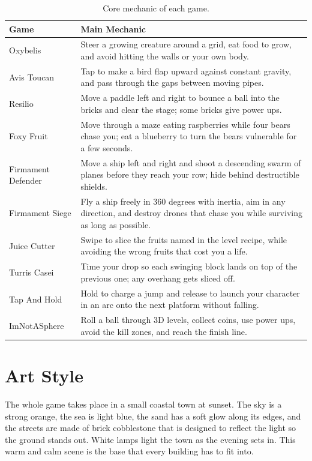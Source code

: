 \documentclass[12pt,letterpaper]{article}
\begin{document}
\begin{table}[H]
\centering
\footnotesize
\begin{tabular}{|p{3.2cm}|p{12cm}|}
\hline
\textbf{Game} & \textbf{Main Mechanic} \\
\hline
Oxybelis & Steer a growing creature around a grid, eat food to grow, and avoid hitting the walls or your own body. \\
\hline
Avis Toucan & Tap to make a bird flap upward against constant gravity, and pass through the gaps between moving pipes. \\
\hline
Resilio & Move a paddle left and right to bounce a ball into the bricks and clear the stage; some bricks give power ups. \\
\hline
Foxy Fruit & Move through a maze eating raspberries while four bears chase you; eat a blueberry to turn the bears vulnerable for a few seconds. \\
\hline
Firmament Defender & Move a ship left and right and shoot a descending swarm of planes before they reach your row; hide behind destructible shields. \\
\hline
Firmament Siege & Fly a ship freely in 360 degrees with inertia, aim in any direction, and destroy drones that chase you while surviving as long as possible. \\
\hline
Juice Cutter & Swipe to slice the fruits named in the level recipe, while avoiding the wrong fruits that cost you a life. \\
\hline
Turris Casei & Time your drop so each swinging block lands on top of the previous one; any overhang gets sliced off. \\
\hline
Tap And Hold & Hold to charge a jump and release to launch your character in an arc onto the next platform without falling. \\
\hline
ImNotASphere & Roll a ball through 3D levels, collect coins, use power ups, avoid the kill zones, and reach the finish line. \\
\hline
\end{tabular}
\caption{Core mechanic of each game.}
\end{table}

\section{Art Style}

The whole game takes place in a small coastal town at sunset. The sky is a strong orange, the sea is light blue, the sand has a soft glow along its edges, and the streets are made of brick cobblestone that is designed to reflect the light so the ground stands out. White lamps light the town as the evening sets in. This warm and calm scene is the base that every building has to fit into.
\end{document}
